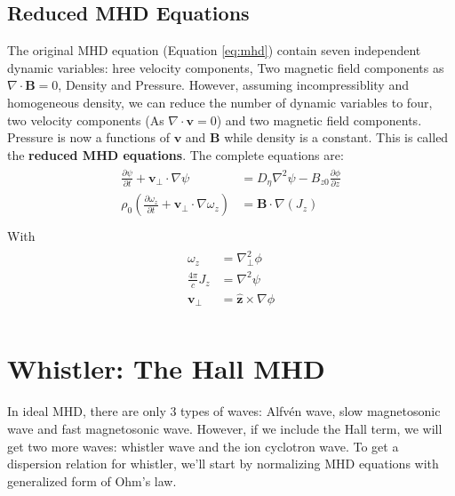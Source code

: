 \documentclass[12pt]{article}
\newenvironment{changemargin}[2]{
\begin{list}{}{
\setlength{\topsep}{0pt}
\setlength{\leftmargin}{#1}
\setlength{\rightmargin}{#2}
\setlength{\listparindent}{\parindent}
\setlength{\itemindent}{\parindent}
\setlength{\parsep}{\parskip}
}
\item[]}{\end{list}}
\begin{document}
\begin{changemargin}{-2cm}{-2cm}
    \subsection{Reduced MHD Equations}
    The original MHD equation (Equation \ref{eq:mhd}) contain seven independent dynamic variables: hree velocity components, Two magnetic field components as $\nabla \cdot \mathbf{B} = 0$, Density and Pressure.
    However, assuming incompressiblity and homogeneous density, we can reduce the number of dynamic variables to four, two velocity components (As $\nabla \cdot \mathbf{v} = 0$) and two magnetic field components. Pressure is now a functions of $\mathbf{v}$ and $\mathbf{B}$ while density is a constant. This is called the \textbf{reduced MHD equations}. The complete equations are\cite{article3}:
    \begin{align}\label{eq:reduced-mhd-1}
        \begin{split}
            \frac{\partial \psi}{\partial t} + \mathbf{v_\perp}\cdot \nabla \psi&=D_{\eta}\nabla^2\psi - B_{z0}\frac{\partial \phi}{\partial z}\\
            \rho_0\left(\frac{\partial \omega_z}{\partial t} + \mathbf{v_\perp}\cdot \nabla \omega_z \right) & = \mathbf{B}\cdot \nabla (J_z)\\
        \end{split}
    \end{align}
    With
    \begin{align}\label{eq:reduced-mhd-2}
        \begin{split}
            \omega_z &= \nabla_\perp^2\phi\\
            \frac{4\pi}{c}J_z &= \nabla^2 \psi\\
            \mathbf{v_\perp} &= \mathbf{\hat{z}}\times \nabla \phi\\
        \end{split}
    \end{align}

    \section{Whistler: The Hall MHD}
    In ideal MHD, there are only 3 types of waves: Alfv\'en wave, slow magnetosonic wave and fast magnetosonic wave. However, if
    we include the Hall term, we will get two more waves: whistler wave and the ion cyclotron wave.\cite{article4} To get a dispersion relation for whistler, we'll start by normalizing MHD equations with generalized form of Ohm's law.


\end{changemargin}
\end{document}
